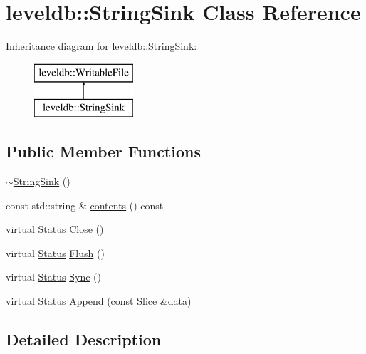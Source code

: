 \hypertarget{classleveldb_1_1_string_sink}{}\section{leveldb\+:\+:String\+Sink Class Reference}
\label{classleveldb_1_1_string_sink}
Inheritance diagram for leveldb\+:\+:String\+Sink\+:\begin{figure}[H]
\begin{center}
\leavevmode
\includegraphics[height=2.000000cm]{classleveldb_1_1_string_sink}
\end{center}
\end{figure}
\subsection*{Public Member Functions}
\begin{DoxyCompactItemize}
\item 
\hyperlink{classleveldb_1_1_string_sink_a0cedd3ea3f2c0353f64c8e7509bc8107}{$\sim$\+String\+Sink} ()
\item 
const std\+::string \& \hyperlink{classleveldb_1_1_string_sink_ac6a122614f3a447d2633e5a5725a9613}{contents} () const 
\item 
virtual \hyperlink{classleveldb_1_1_status}{Status} \hyperlink{classleveldb_1_1_string_sink_a40e2142f8078720ecbad8a1d48be6f48}{Close} ()
\item 
virtual \hyperlink{classleveldb_1_1_status}{Status} \hyperlink{classleveldb_1_1_string_sink_af8dc901a44e89b56726bde2782a41ab7}{Flush} ()
\item 
virtual \hyperlink{classleveldb_1_1_status}{Status} \hyperlink{classleveldb_1_1_string_sink_a77f1f2b9797737fbd89211ba0bb9a93e}{Sync} ()
\item 
virtual \hyperlink{classleveldb_1_1_status}{Status} \hyperlink{classleveldb_1_1_string_sink_a10db68412947f16bde307677a663c241}{Append} (const \hyperlink{classleveldb_1_1_slice}{Slice} \&data)
\end{DoxyCompactItemize}


\subsection{Detailed Description}


